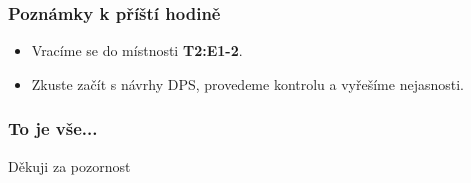 \documentclass{beamer}
\begin{document}
	\begin{frame}
    \frametitle{Poznámky k příští hodině}
		
		\begin{itemize}
			\item Vracíme se do místnosti \textbf{T2:E1-2}.
			\item Zkuste začít s návrhy DPS, provedeme kontrolu a vyřešíme nejasnosti.
		\end{itemize}
	\end{frame}
	\begin{frame}
    \frametitle{To je vše...}
		
		\begin{center}
			\Large{Děkuji za pozornost}
		\end{center}
	\end{frame}
\end{document}
